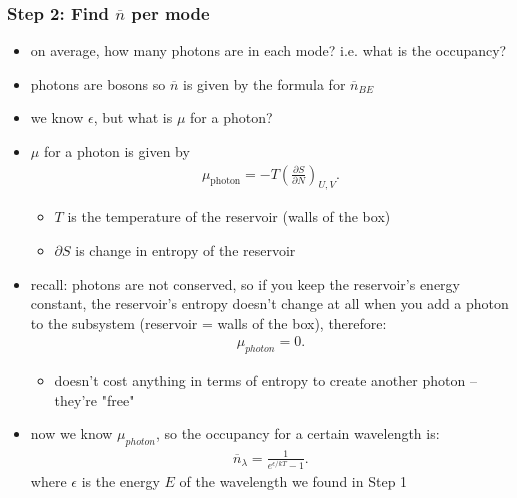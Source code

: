 \documentclass[10pt]{article}
\begin{document}
\subsubsection*{Step 2: Find $\overline{n}$ per mode}
\begin{itemize}
    \item on average, how many photons are in each mode? i.e. what is the occupancy?
    \item photons are bosons so $\overline{n}$ is given by the formula for  $\overline{n}_{BE}$
    \item we know $\epsilon$, but what is $\mu$ for a photon?
    \item $\mu$ for a photon is given by 
        \begin{gather*}
            \mu_{\text{photon}} = -T \left( \frac{\partial S}{\partial N} \right)_{U,V}
        .\end{gather*}
        \begin{itemize}
            \item $T$ is the temperature of the reservoir (walls of the box)
            \item $\partial S$ is change in entropy of the reservoir 
        \end{itemize}
    \item recall: photons are not conserved, so if you keep the reservoir's energy constant, the reservoir's entropy doesn't change at all when you add a photon to the subsystem (reservoir = walls of the box), therefore: 
        \begin{gather*}
            \mu_{photon} = 0
        .\end{gather*}
        \begin{itemize}
            \item doesn't cost anything in terms of entropy to create another photon -- they're "free"
        \end{itemize}
    \item now we know $\mu_{photon}$, so the occupancy for a certain wavelength is:
        \begin{gather*}
            \overline{n}_{\lambda} = \frac{1}{e^{\epsilon / kT} - 1}
        .\end{gather*}
        where $\epsilon$ is the energy $E$ of the wavelength we found in Step 1
\end{itemize}
\end{document}
